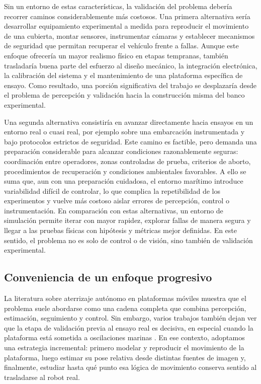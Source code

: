 \documentclass[12pt,a4paper]{report}
\begin{document}
Sin un entorno de estas características, la validación del problema debería
recorrer caminos considerablemente más costosos. Una primera alternativa sería
desarrollar equipamiento experimental a medida para reproducir el movimiento de una
cubierta, montar sensores, instrumentar cámaras y establecer mecanismos de
seguridad que permitan recuperar el vehículo frente a fallas. Aunque este
enfoque ofrecería un mayor realismo físico en etapas tempranas, también
trasladaría buena parte del esfuerzo al diseño mecánico, la integración
electrónica, la calibración del sistema y el mantenimiento de una plataforma
específica de ensayo. Como resultado, una porción significativa del trabajo se
desplazaría desde el problema de percepción y validación hacia la construcción
misma del banco experimental.

Una segunda alternativa consistiría en avanzar directamente hacia ensayos en un
entorno real o cuasi real, por ejemplo sobre una embarcación instrumentada y
bajo protocolos estrictos de seguridad. Este camino es factible, pero demanda
una preparación considerable para alcanzar condiciones razonablemente seguras:
coordinación entre operadores, zonas controladas de prueba, criterios de
aborto, procedimientos de recuperación y condiciones ambientales favorables. A
ello se suma que, aun con una preparación cuidadosa, el entorno marítimo
introduce variabilidad difícil de controlar, lo que complica la repetibilidad
de los experimentos y vuelve más costoso aislar errores de percepción, control
o instrumentación. En comparación con estas alternativas, un entorno de
simulación permite iterar con mayor rapidez, explorar fallas de manera segura y
llegar a las pruebas físicas con hipótesis y métricas mejor definidas.
En este sentido, el problema no es solo de control o de visión, sino también de
validación experimental.

\subsection{Conveniencia de un enfoque progresivo}

La literatura sobre aterrizaje autónomo en plataformas móviles muestra que el
problema suele abordarse como una cadena completa que combina percepción,
estimación, seguimiento y control. Sin embargo, varios trabajos también dejan
ver que la etapa de validación previa al ensayo real es decisiva, en especial
cuando la plataforma está sometida a oscilaciones marinas
\citep{SanchezLopez2014,Delbene2022,Cho2022,Keipour2022}. En ese contexto,
adoptamos una estrategia incremental: primero modelar y reproducir el
movimiento de la plataforma, luego estimar su pose relativa desde distintas
fuentes de imagen y, finalmente, estudiar hasta qué punto esa lógica de
movimiento conserva sentido al trasladarse al robot real.
\end{document}
